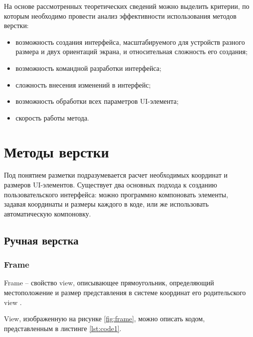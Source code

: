 На основе рассмотренных теоретических сведений можно выделить критерии, по которым необходимо провести анализ эффективности использования методов верстки:

\begin{itemize}[label=---]
	\item возможность создания интерфейса, масштабируемого для устройств разного размера и двух ориентаций экрана, и относительная сложность его создания;
	\item возможность командной разработки интерфейса;
	\item сложность внесения изменений в интерфейс;
	\item возможность обработки всех параметров UI-элемента;
	\item скорость работы метода.
\end{itemize}

\chapter{Методы верстки}

Под понятием разметки подразумевается расчет необходимых координат и размеров UI-элементов.
Существует два основных подхода к созданию пользовательского интерфейса: можно программно компоновать элементы, задавая координаты и размеры каждого в коде, или же использовать автоматическую компоновку.

\section{Ручная верстка}

\subsection{Frame}

Frame \cite{frame} -- свойство view, описывающее прямоугольник, определяющий местоположение и размер представления в системе координат его родительского view \cite{superview}.

View, изображенную на рисунке \ref{fig:frame}, можно описать кодом, представленным в листинге \ref{lst:code1}. 

